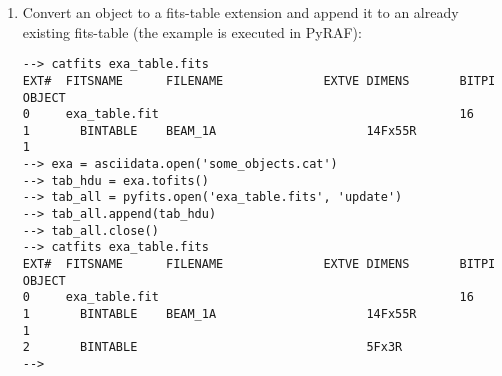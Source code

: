 \begin{enumerate}
\item Convert an \ad object to a fits-table extension and append it to an
already existing fits-table (the example is executed in PyRAF):
\begin{small}
\begin{verbatim}
--> catfits exa_table.fits
EXT#  FITSNAME      FILENAME              EXTVE DIMENS       BITPI OBJECT
0     exa_table.fit                                          16
1       BINTABLE    BEAM_1A                     14Fx55R            1
--> exa = asciidata.open('some_objects.cat')
--> tab_hdu = exa.tofits()
--> tab_all = pyfits.open('exa_table.fits', 'update')
--> tab_all.append(tab_hdu)
--> tab_all.close()
--> catfits exa_table.fits
EXT#  FITSNAME      FILENAME              EXTVE DIMENS       BITPI OBJECT
0     exa_table.fit                                          16
1       BINTABLE    BEAM_1A                     14Fx55R            1
2       BINTABLE                                5Fx3R
-->
\end{verbatim}
\end{small}
\end{enumerate}


